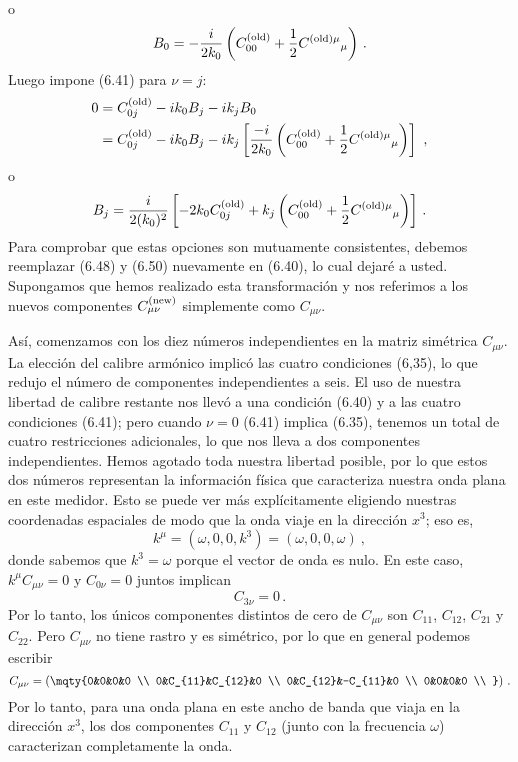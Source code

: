 \documentclass[11pt,b5paper,openany,twoside]{book}
\newcommand{\mn}{{\mu\nu}}
\begin{document}
o
\begin{equation}
B_0=-{{i}\over {2k_0}}\left(C^{\rm (old)}_{00}+{1\over 2}
C^{{\rm (old)}\mu}{}_\mu\right)\,.\label{6.48}
\end{equation}
Luego impone (6.41) para $\nu=j$:
\begin{align}
0  &=  C^{\rm (old)}_{0j}-ik_0 B_j -ik_jB_0 \notag \\
&=  C^{\rm (old)}_{0j}-ik_0B_j -ik_j\left[
{{-i}\over {2k_0}}\left(C^{\rm (old)}_{00}+{1\over 2}
C^{{\rm (old)}\mu}{}_\mu\right)\right]\ , \label{6.49}
\end{align}
o
\begin{equation}
B_j={{i}\over{2(k_0)^2}}\left[-2k_0C^{\rm (old)}_{0j}
+k_j\left(C^{\rm (old)}_{00}+{1\over 2}
C^{{\rm (old)}\mu}{}_\mu\right)\right]\,.\label{6.50}
\end{equation}
Para comprobar que estas opciones son mutuamente consistentes, debemos reemplazar (6.48) y (6.50) nuevamente en (6.40), lo cual dejaré a usted.
Supongamos que hemos realizado esta transformación y nos referimos a los nuevos componentes $C_\mn^{\rm (new)}$ simplemente como $C_\mn$.

Así, comenzamos con los diez números independientes en la matriz simétrica $C_\mn$.
La elección del calibre armónico implicó las cuatro condiciones (6,35), lo que redujo el número de componentes independientes a seis.
El uso de nuestra libertad de calibre restante nos llevó a una condición (6.40) y a las cuatro condiciones (6.41); pero cuando $\nu=0$ (6.41) implica (6.35), tenemos un total de cuatro restricciones adicionales, lo que nos lleva a dos componentes independientes.
Hemos agotado toda nuestra libertad posible, por lo que estos dos números representan la información física que caracteriza nuestra onda plana en este medidor.
Esto se puede ver más explícitamente eligiendo nuestras coordenadas espaciales de modo que la onda viaje en la dirección $x^3$; eso es,
\begin{equation}
k^\mu = (\omega,0,0,k^3) = (\omega,0,0,\omega)\ ,\label{6.51}
\end{equation}
donde sabemos que $k^3=\omega$ porque el vector de onda es nulo.
En este caso, $k^\mu C_\mn=0$ y $C_{0\nu}=0$ juntos implican
\begin{equation}
C_{3\nu}=0\,.\label{6.52}
\end{equation}
Por lo tanto, los únicos componentes distintos de cero de $C_\mn$ son $C_{11}$, $C_{12}$, $C_{21}$ y $C_{22}$.
Pero $C_\mn$ no tiene rastro y es simétrico, por lo que en general podemos escribir
\begin{equation}
C_\mn = \left(\mqty{0&0&0&0 \\  0&C_{11}&C_{12}&0 \\
0&C_{12}&-C_{11}&0 \\  0&0&0&0 \\ }\right)\,.\label{6.53}
\end{equation}
Por lo tanto, para una onda plana en este ancho de banda que viaja en la dirección $x^3$, los dos componentes $C_{11}$ y $C_{12}$ (junto con la frecuencia $\omega$) caracterizan completamente la onda.
\end{document}
